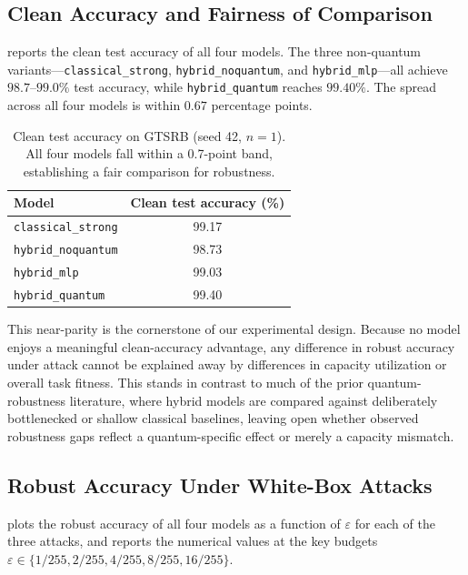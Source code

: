 \documentclass[11pt]{article}
\newcommand{\eps}{\varepsilon}
\begin{document}
\subsection{Clean Accuracy and Fairness of Comparison}
\label{sec:exp:clean}

 reports the clean test accuracy of all four models.
The three non-quantum variants---\texttt{classical\_strong},
\texttt{hybrid\_noquantum}, and \texttt{hybrid\_mlp}---all achieve
$98.7$--$99.0\%$ test accuracy, while \texttt{hybrid\_quantum} reaches
$99.40\%$. The spread across all four models is within $0.67$ percentage
points.

\begin{table}[t]
\centering
\caption{Clean test accuracy on GTSRB (seed 42, $n=1$). All four models
fall within a 0.7-point band, establishing a fair comparison for
robustness.}
\label{tab:clean}
\begin{tabular}{lc}
\toprule
Model & Clean test accuracy (\%) \\
\midrule
\texttt{classical\_strong}    & 99.17 \\
\texttt{hybrid\_noquantum}    & 98.73 \\
\texttt{hybrid\_mlp}           & 99.03 \\
\texttt{hybrid\_quantum}       & 99.40 \\
\bottomrule
\end{tabular}
\end{table}

This near-parity is the cornerstone of our experimental design. Because
no model enjoys a meaningful clean-accuracy advantage, any difference in
robust accuracy under attack cannot be explained away by differences in
capacity utilization or overall task fitness. This stands in contrast to
much of the prior quantum-robustness literature, where hybrid models are
compared against deliberately bottlenecked or shallow classical baselines,
leaving open whether observed robustness gaps reflect a quantum-specific
effect or merely a capacity mismatch.

\subsection{Robust Accuracy Under White-Box Attacks}
\label{sec:exp:robust}

 plots the robust accuracy of all four models as a
function of $\eps$ for each of the three attacks, and 
reports the numerical values at the key budgets
$\eps \in \{1/255, 2/255, 4/255, 8/255, 16/255\}$.
\end{document}
